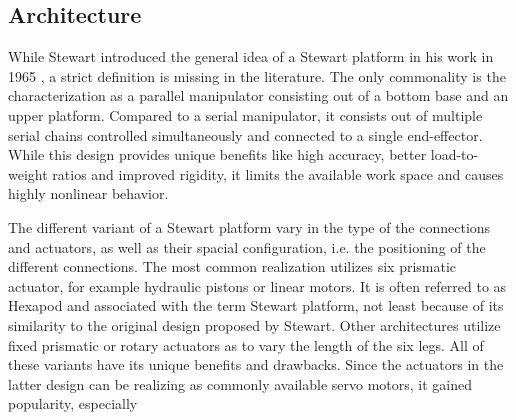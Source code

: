 \subsection{Architecture}
While Stewart introduced the general idea of a Stewart platform in his work in
1965 \citep{Ste65}, a strict definition is missing in the literature. The only
commonality is the characterization as a parallel manipulator \citep{Szu13}
consisting out of a bottom base and an upper platform. Compared to a serial
manipulator, it consists out of multiple serial chains controlled
simultaneously and connected to a single end-effector. While this design
provides unique benefits like high accuracy, better load-to-weight ratios and
improved rigidity, it limits the available work space and causes highly
nonlinear behavior.

The different variant of a Stewart platform vary in the type of the
connections and actuators, as well as their spacial configuration, i.e. the
positioning of the different connections. The most common realization utilizes
six prismatic actuator, for example hydraulic pistons or linear motors. It is
often referred to as Hexapod and associated with the term Stewart platform,
not least because of its similarity to the original design proposed by
Stewart. Other architectures utilize fixed prismatic or rotary actuators as to
vary the length of the six legs. All of these variants have its unique
benefits and drawbacks. Since the actuators in the latter design can be
realizing as commonly available servo motors, it gained popularity, especially
